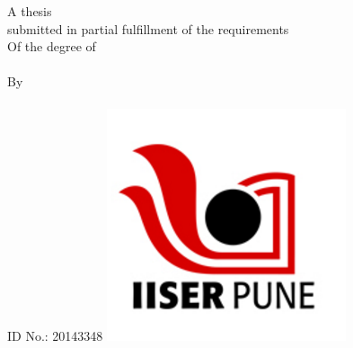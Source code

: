 \documentclass[
11pt, %
english, %
singlespacing, %
headsepline, %
]{MastersDoctoralThesis} %
\author{\textbf{Vinay Hegde}} %
\begin{document}
\frontmatter %

\pagestyle{plain} %


\begin{titlepage}
\begin{center}

{\huge \bfseries \ttitle\par}\vspace{0.4cm} %

\vfill
\Large A thesis\\\vspace{0.5cm} submitted in partial fulfillment of the requirements\\\vspace{2cm} Of the degree of\\\vspace{0.5cm} \degreename\\[0.3cm] %
\vspace{1.5cm}By\\\vspace{1cm}
\authorname\\
ID No.: 20143348
\vfill
\vspace{1cm}
\includegraphics[width=0.2\linewidth]{Figures/iiser_logo.png} %

\vspace*{.06\textheight}
{\scshape\LARGE \univname\par}\vspace{1.5cm} %


\end{center}
\end{titlepage}
\end{document}

